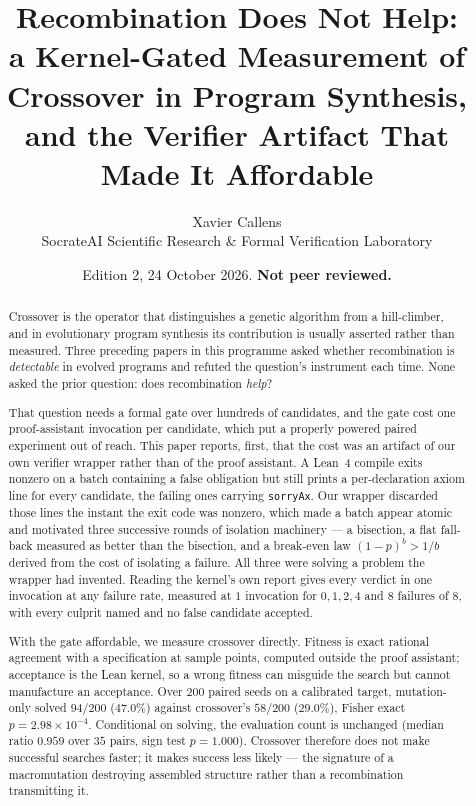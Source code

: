\documentclass[11pt,a4paper]{article}
\title{\textbf{Recombination Does Not Help:\\
a Kernel-Gated Measurement of Crossover in Program Synthesis,\\
and the Verifier Artifact That Made It Affordable}}
\author{Xavier Callens\\
\small SocrateAI Scientific Research \& Formal Verification Laboratory}
\date{Edition 2, 24 October 2026. \textbf{Not peer reviewed.}}
\theoremstyle{definition}
\theoremstyle{remark}
\begin{document}
\maketitle

\begin{abstract}
Crossover is the operator that distinguishes a genetic algorithm from a
hill-climber, and in evolutionary program synthesis its contribution is usually
asserted rather than measured. Three preceding papers in this programme asked
whether recombination is \emph{detectable} in evolved programs and refuted the
question's instrument each time. None asked the prior question: does
recombination \emph{help}?

That question needs a formal gate over hundreds of candidates, and the gate cost
one proof-assistant invocation per candidate, which put a properly powered
paired experiment out of reach. This paper reports, first, that the cost was an
artifact of our own verifier wrapper rather than of the proof assistant. A Lean~4
compile exits nonzero on a batch containing a false obligation but still prints a
per-declaration axiom line for every candidate, the failing ones carrying
\texttt{sorryAx}. Our wrapper discarded those lines the instant the exit code was
nonzero, which made a batch appear atomic and motivated three successive rounds
of isolation machinery --- a bisection, a flat fall-back measured as better than
the bisection, and a break-even law $(1-p)^b > 1/b$ derived from the cost of
isolating a failure. All three were solving a problem the wrapper had invented.
Reading the kernel's own report gives every verdict in one invocation at any
failure rate, measured at $1$ invocation for $0,1,2,4$ and $8$ failures of $8$,
with every culprit named and no false candidate accepted.

With the gate affordable, we measure crossover directly. Fitness is exact
rational agreement with a specification at sample points, computed outside the
proof assistant; acceptance is the Lean kernel, so a wrong fitness can misguide
the search but cannot manufacture an acceptance. Over $200$ paired seeds on a
calibrated target, mutation-only solved $94/200$ ($47.0\%$) against crossover's
$58/200$ ($29.0\%$), Fisher exact $p = 2.98\times10^{-4}$. Conditional on
solving, the evaluation count is unchanged (median ratio $0.959$ over $35$ pairs,
sign test $p = 1.000$). Crossover therefore does not make successful searches
faster; it makes success less likely --- the signature of a macromutation
destroying assembled structure rather than a recombination transmitting it.


\end{abstract}
\end{document}

